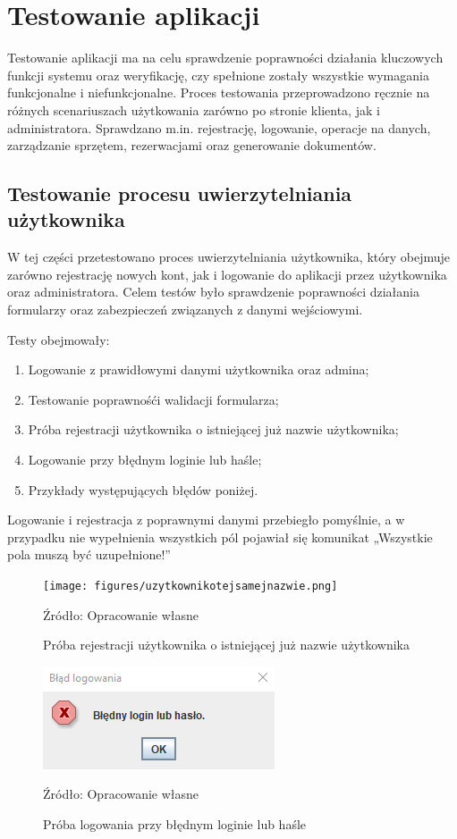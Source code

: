 \chapter{Testowanie aplikacji}
\label{cha:testowanieAplikacji}
Testowanie aplikacji ma na celu sprawdzenie poprawności działania kluczowych funkcji systemu oraz weryfikację, czy spełnione zostały wszystkie wymagania funkcjonalne i niefunkcjonalne. Proces testowania przeprowadzono ręcznie na różnych scenariuszach użytkowania zarówno po stronie klienta, jak i administratora. Sprawdzano m.in. rejestrację, logowanie, operacje na danych, zarządzanie sprzętem, rezerwacjami oraz generowanie dokumentów.

\section{Testowanie procesu uwierzytelniania użytkownika}
\label{sec:testlogowania}
W tej części przetestowano proces uwierzytelniania użytkownika, który obejmuje zarówno rejestrację nowych kont, jak i logowanie do aplikacji przez użytkownika oraz administratora. Celem testów było sprawdzenie poprawności działania formularzy oraz zabezpieczeń związanych z danymi wejściowymi.
\par
Testy obejmowały:
\begin{enumerate}%
\item Logowanie z prawidłowymi danymi użytkownika oraz admina;
\item Testowanie poprawnośći walidacji formularza;
\item Próba rejestracji użytkownika o istniejącej już nazwie użytkownika;
\item Logowanie przy błędnym loginie lub haśle;
\item Przykłady występujących błędów poniżej.
\end{enumerate}
Logowanie i rejestracja z poprawnymi danymi przebiegło pomyślnie, a w przypadku nie wypełnienia wszystkich pól pojawiał się komunikat „Wszystkie pola muszą być uzupełnione!”
\vspace{-0.2cm}
\begin{figure}[!htbp]
    \centering
    \texttt{[image: figures/uzytkownikotejsamejnazwie.png]}
    \caption{Próba rejestracji użytkownika o istniejącej już nazwie użytkownika}
    \label{fig:uzytkownikotejsamejNazwie}
    \small{Źródło: Opracowanie własne}
\end{figure}

\vspace{-0.2cm}
\begin{figure}[!htbp]
    \centering
    \includegraphics[width=0.5\linewidth, keepaspectratio]{figures/blednyloginlubhaslo.png}
    \caption{Próba logowania przy błędnym loginie lub haśle}
    \label{fig:blednyloginhaslo}
    \small{Źródło: Opracowanie własne}
\end{figure}
\clearpage

